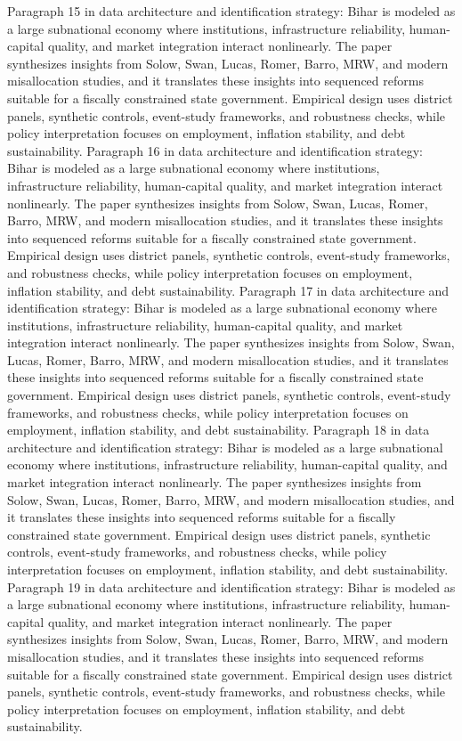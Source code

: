 \documentclass[preprint,12pt]{elsarticle}
\begin{document}
Paragraph 15 in data architecture and identification strategy: Bihar is modeled as a large subnational economy where institutions, infrastructure reliability, human-capital quality, and market integration interact nonlinearly. The paper synthesizes insights from Solow, Swan, Lucas, Romer, Barro, MRW, and modern misallocation studies, and it translates these insights into sequenced reforms suitable for a fiscally constrained state government. Empirical design uses district panels, synthetic controls, event-study frameworks, and robustness checks, while policy interpretation focuses on employment, inflation stability, and debt sustainability.
Paragraph 16 in data architecture and identification strategy: Bihar is modeled as a large subnational economy where institutions, infrastructure reliability, human-capital quality, and market integration interact nonlinearly. The paper synthesizes insights from Solow, Swan, Lucas, Romer, Barro, MRW, and modern misallocation studies, and it translates these insights into sequenced reforms suitable for a fiscally constrained state government. Empirical design uses district panels, synthetic controls, event-study frameworks, and robustness checks, while policy interpretation focuses on employment, inflation stability, and debt sustainability.
Paragraph 17 in data architecture and identification strategy: Bihar is modeled as a large subnational economy where institutions, infrastructure reliability, human-capital quality, and market integration interact nonlinearly. The paper synthesizes insights from Solow, Swan, Lucas, Romer, Barro, MRW, and modern misallocation studies, and it translates these insights into sequenced reforms suitable for a fiscally constrained state government. Empirical design uses district panels, synthetic controls, event-study frameworks, and robustness checks, while policy interpretation focuses on employment, inflation stability, and debt sustainability.
Paragraph 18 in data architecture and identification strategy: Bihar is modeled as a large subnational economy where institutions, infrastructure reliability, human-capital quality, and market integration interact nonlinearly. The paper synthesizes insights from Solow, Swan, Lucas, Romer, Barro, MRW, and modern misallocation studies, and it translates these insights into sequenced reforms suitable for a fiscally constrained state government. Empirical design uses district panels, synthetic controls, event-study frameworks, and robustness checks, while policy interpretation focuses on employment, inflation stability, and debt sustainability.
Paragraph 19 in data architecture and identification strategy: Bihar is modeled as a large subnational economy where institutions, infrastructure reliability, human-capital quality, and market integration interact nonlinearly. The paper synthesizes insights from Solow, Swan, Lucas, Romer, Barro, MRW, and modern misallocation studies, and it translates these insights into sequenced reforms suitable for a fiscally constrained state government. Empirical design uses district panels, synthetic controls, event-study frameworks, and robustness checks, while policy interpretation focuses on employment, inflation stability, and debt sustainability.
\end{document}
